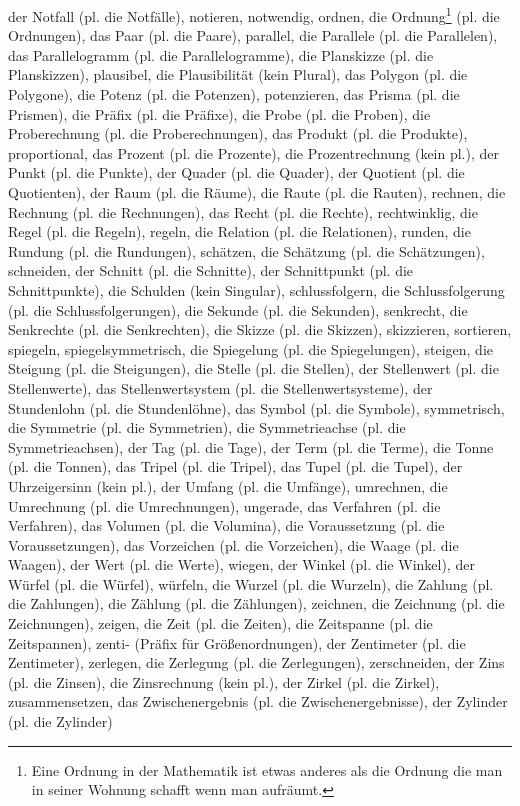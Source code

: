 der Notfall (pl. die Notfälle),
notieren,
notwendig,
ordnen,
die Ordnung\footnote{Eine Ordnung in der Mathematik ist etwas anderes als die Ordnung die man in seiner Wohnung schafft wenn man aufräumt.} (pl. die Ordnungen),
das Paar (pl. die Paare),
parallel,
die Parallele (pl. die Parallelen),
das Parallelogramm (pl. die Parallelogramme),
die Planskizze (pl. die Planskizzen),
plausibel,
die Plausibilität (kein Plural),
das Polygon (pl. die Polygone),
die Potenz (pl. die Potenzen),
potenzieren,
das Prisma (pl. die Prismen),
die Präfix (pl. die Präfixe),
die Probe (pl. die Proben),
die Proberechnung (pl. die Proberechnungen),
das Produkt (pl. die Produkte),
proportional,
das Prozent (pl. die Prozente),
die Prozentrechnung (kein pl.),
der Punkt (pl. die Punkte),
der Quader (pl. die Quader),
der Quotient (pl. die Quotienten),
der Raum (pl. die Räume),
die Raute (pl. die Rauten),
rechnen,
die Rechnung (pl. die Rechnungen),
das Recht (pl. die Rechte),
rechtwinklig,
die Regel (pl. die Regeln),
regeln,
die Relation (pl. die Relationen),
runden,
die Rundung (pl. die Rundungen),
schätzen,
die Schätzung (pl. die Schätzungen),
schneiden,
der Schnitt (pl. die Schnitte),
der Schnittpunkt (pl. die Schnittpunkte),
die Schulden (kein Singular),
schlussfolgern,
die Schlussfolgerung (pl. die Schlussfolgerungen),
die Sekunde (pl. die Sekunden),
senkrecht,
die Senkrechte (pl. die Senkrechten),
die Skizze (pl. die Skizzen),
skizzieren,
sortieren,
spiegeln,
spiegelsymmetrisch,
die Spiegelung (pl. die Spiegelungen),
steigen,
die Steigung (pl. die Steigungen),
die Stelle (pl. die Stellen),
der Stellenwert (pl. die Stellenwerte),
das Stellenwertsystem (pl. die Stellenwertsysteme),
der Stundenlohn (pl. die Stundenlöhne),
das Symbol (pl. die Symbole),
symmetrisch,
die Symmetrie (pl. die Symmetrien),
die Symmetrieachse (pl. die Symmetrieachsen),
der Tag (pl. die Tage),
der Term (pl. die Terme),
die Tonne (pl. die Tonnen),
das Tripel (pl. die Tripel),
das Tupel (pl. die Tupel),
der Uhrzeigersinn (kein pl.),
der Umfang (pl. die Umfänge),
umrechnen,
die Umrechnung (pl. die Umrechnungen),
ungerade,
das Verfahren (pl. die Verfahren),
das Volumen (pl. die Volumina),
die Voraussetzung (pl. die Voraussetzungen),
das Vorzeichen (pl. die Vorzeichen),
die Waage (pl. die Waagen),
der Wert (pl. die Werte),
wiegen,
der Winkel (pl. die Winkel),
der Würfel (pl. die Würfel),
würfeln,
die Wurzel (pl. die Wurzeln),
die Zahlung (pl. die Zahlungen),
die Zählung (pl. die Zählungen),
zeichnen,
die Zeichnung (pl. die Zeichnungen),
zeigen,
die Zeit (pl. die Zeiten),
die Zeitspanne (pl. die Zeitspannen),
zenti- (Präfix für Größenordnungen),
der Zentimeter (pl. die Zentimeter),
zerlegen,
die Zerlegung (pl. die Zerlegungen),
zerschneiden,
der Zins (pl. die Zinsen),
die Zinsrechnung (kein pl.),
der Zirkel (pl. die Zirkel),
zusammensetzen,
das Zwischenergebnis (pl. die Zwischenergebnisse),
der Zylinder (pl. die Zylinder) 